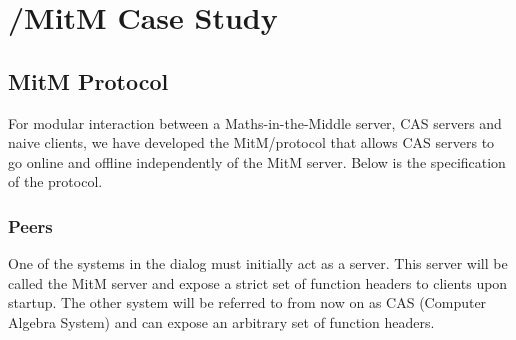 \section{\GAP/\Singular MitM Case Study}\label{sec:mitm_poc}

\subsection{MitM Protocol}

For modular interaction between a Maths-in-the-Middle server, CAS \SCSCP servers 
and naive clients, we have developed the MitM/\SCSCP protocol that allows CAS 
servers to go online and offline independently of the MitM server. Below is the 
specification of the protocol.

\subsubsection{Peers}
One of the systems in the dialog must initially act as a server. This server will 
be called the MitM server and expose a strict set of function headers to clients 
upon startup. The other system will be referred to from now on as CAS (Computer 
Algebra System) and can expose an arbitrary set of function headers.

